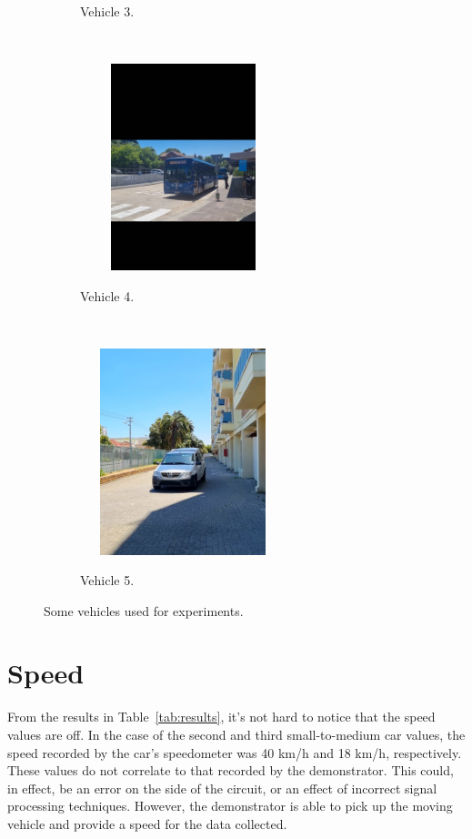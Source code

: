 \documentclass[class=report,11pt,crop=false]{standalone}
\begin{document}
\begin{figure}[htbp]
\begin{subfigure}[t]{0.4\textwidth}
        \caption{Vehicle 3.}
    \end{subfigure}
    ~     \begin{subfigure}[t]{0.4\textwidth}
        \centering
        \def\svgwidth{1\linewidth}
        {\scriptsize
            \includegraphics[width=6cm,height=6cm]{../Images/vehicles/4.jpg}}
        \caption{Vehicle 4.}
    \end{subfigure}
    ~     \begin{subfigure}[t]{0.4\textwidth}
        \centering
        \def\svgwidth{1\linewidth}
        {\scriptsize
            \includegraphics[width=6cm,height=6cm]{../Images/vehicles/5.jpg}}
        \caption{Vehicle 5.}
    \end{subfigure}
    \caption{Some vehicles used for experiments.}
\end{figure}

\section{Speed}
From the results in Table~\ref{tab:results}, it's not hard to notice that the speed values are off. In the case of the second and third small-to-medium car values, the speed recorded by the car's speedometer was 40 km/h and 18 km/h, respectively. These values do not correlate to that recorded by the demonstrator. This could, in effect, be an error on the side of the circuit, or an effect of incorrect signal processing techniques. However, the demonstrator is able to pick up the moving vehicle and provide a speed for the data collected.
\end{document}
